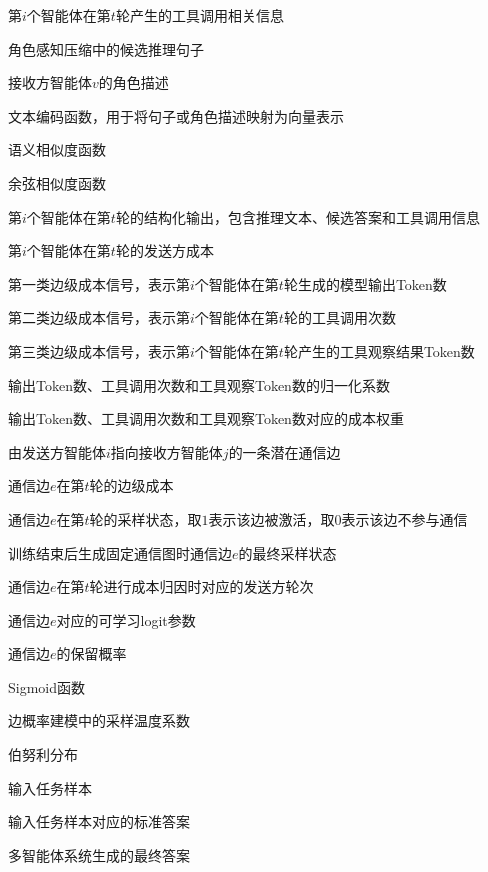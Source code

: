 \begin{symbols}
  \item[$q_i^{(t)}$] 第$i$个智能体在第$t$轮产生的工具调用相关信息
  \item[$s$] 角色感知压缩中的候选推理句子
  \item[$d_v$] 接收方智能体$v$的角色描述
  \item[$\phi(\cdot)$] 文本编码函数，用于将句子或角色描述映射为向量表示
  \item[$\operatorname{sim}(\cdot)$] 语义相似度函数
  \item[$\cos(\cdot)$] 余弦相似度函数
  \item[$o_i^{(t)}$] 第$i$个智能体在第$t$轮的结构化输出，包含推理文本、候选答案和工具调用信息
  \item[$c_i^{(t)}$] 第$i$个智能体在第$t$轮的发送方成本
  \item[$O_i^{(t)}$] 第一类边级成本信号，表示第$i$个智能体在第$t$轮生成的模型输出Token数
  \item[$K_i^{(t)}$] 第二类边级成本信号，表示第$i$个智能体在第$t$轮的工具调用次数
  \item[$Z_i^{(t)}$] 第三类边级成本信号，表示第$i$个智能体在第$t$轮产生的工具观察结果Token数
  \item[$N_o,N_k,N_z$] 输出Token数、工具调用次数和工具观察Token数的归一化系数
  \item[$\lambda_o,\lambda_k,\lambda_z$] 输出Token数、工具调用次数和工具观察Token数对应的成本权重
  \item[$e=(i,j)$] 由发送方智能体$i$指向接收方智能体$j$的一条潜在通信边
  \item[$\mathcal{C}_e^{(t)}$] 通信边$e$在第$t$轮的边级成本
  \item[$z_e^{(t)}$] 通信边$e$在第$t$轮的采样状态，取$1$表示该边被激活，取$0$表示该边不参与通信
  \item[$z_e^\ast$] 训练结束后生成固定通信图时通信边$e$的最终采样状态
  \item[$\tau(e,t)$] 通信边$e$在第$t$轮进行成本归因时对应的发送方轮次
  \item[$\theta_e$] 通信边$e$对应的可学习logit参数
  \item[$p_e$] 通信边$e$的保留概率
  \item[$\sigma(\cdot)$] Sigmoid函数
  \item[$\tau_p$] 边概率建模中的采样温度系数
  \item[$\operatorname{Bernoulli}(\cdot)$] 伯努利分布
  \item[$x$] 输入任务样本
  \item[$y$] 输入任务样本对应的标准答案
  \item[$\hat{y}$] 多智能体系统生成的最终答案

\end{symbols}
